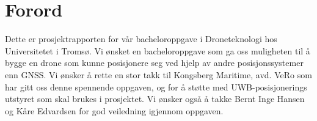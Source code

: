 \section{Forord} 
Dette er prosjektrapporten for vår bacheloroppgave i Droneteknologi hos Universitetet i Tromsø. Vi ønsket en bacheloroppgave som ga oss muligheten til å bygge en drone som kunne posisjonere seg ved hjelp av andre posisjonssystemer enn GNSS. 
Vi ønsker å rette en stor takk til Kongsberg Maritime, avd. VeRo som har gitt oss denne spennende oppgaven, og for å støtte med UWB-posisjonerings utstyret som skal brukes i prosjektet. Vi ønsker også å takke Bernt Inge Hansen og Kåre Edvardsen for god veiledning igjennom oppgaven.
